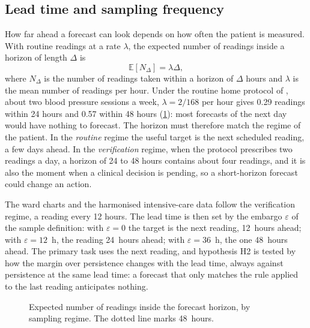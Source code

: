\subsection{Lead time and sampling frequency}\label{sec:horizon}\label{sec:forecasting}

How far ahead a forecast can look depends on how often the patient is measured. With routine readings at a rate $\lambda$, the expected number of readings inside a horizon of length $\Delta$ is
\begin{equation}
  \mathbb{E}[N_\Delta] = \lambda\Delta ,
\end{equation}
where $N_\Delta$ is the number of readings taken within a horizon of $\Delta$ hours and $\lambda$ is the mean number of readings per hour.
Under the routine home protocol of \textcite{mihevc2025}, about two blood pressure sessions a week, $\lambda = 2/168$ per hour gives 0.29 readings within 24 hours and 0.57 within 48 hours (\cref{fig:sampling-horizon}): most forecasts of the next day would have nothing to forecast. The horizon must therefore match the regime of the patient. In the \emph{routine} regime the useful target is the next scheduled reading, a few days ahead. In the \emph{verification} regime, when the protocol prescribes two readings a day, a horizon of 24 to 48 hours contains about four readings, and it is also the moment when a clinical decision is pending, so a short-horizon forecast could change an action.

The ward charts and the harmonised intensive-care data follow the verification regime, a reading every 12 hours. The lead time is then set by the embargo $\varepsilon$ of the sample definition: with $\varepsilon = 0$ the target is the next reading, 12~hours ahead; with $\varepsilon = 12$~h, the reading 24~hours ahead; with $\varepsilon = 36$~h, the one 48~hours ahead. The primary task uses the next reading, and hypothesis H2 is tested by how the margin over persistence changes with the lead time, always against persistence at the same lead time: a forecast that only matches the rule applied to the last reading anticipates nothing.

\begin{figure}[htbp]
\centering
{}
\caption{Expected number of readings inside the forecast horizon, by sampling regime. The dotted line marks 48~hours.}\label{fig:sampling-horizon}
\end{figure}

